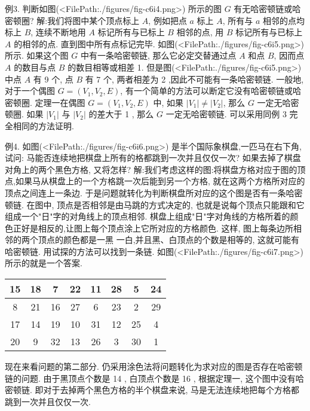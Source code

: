 例3. 判断如图(<FilePath:./figures/fig-c6i4.png>) 所示的图 $G$ 有无哈密顿链或哈密顿圈?
解:我们将图中某个顶点标上 $A$, 例如把点 $a$ 标上 $A$, 所有与 $a$ 相邻的点均标上 $B$, 连续不断地用 $A$ 标记所有与已标上 $B$ 相邻的点, 用 $B$ 标记所有与已标上 $A$ 的相邻的点.
直到图中所有点标记完毕.
如图(<FilePath:./figures/fig-c6i5.png>) 所示.
如果这个图 $G$ 中有一条哈密顿链, 那么它必定交替通过点 $A$ 和点 $B$, 因而点 $A$ 的数目与点 $B$ 的数目相等或相差 1. 但是图(<FilePath:./figures/fig-c6i5.png>) 中点 $A$ 有 9 个, 点 $B$ 有 7 个, 两者相差为 2 ,因此不可能有一条哈密顿链.
一般地, 对于一个偶图 $G=\left(V_1, V_2, E\right)$, 有一个简单的方法可以断定它没有哈密顿链或哈密顿圈.
定理一在偶图 $G=\left(V_1, V_2, E\right)$ 中, 如果 $\left|V_1\right| \neq\left|V_2\right|$, 那么 $G$ 一定无哈密顿圈.
如果 $\left|V_1\right|$ 与 $\left|V_2\right|$ 的差大于 1 , 那么 $G$ 一定无哈密顿链.
可以采用同例 3 完全相同的方法证明.



例4. 如图(<FilePath:./figures/fig-c6i6.png>) 是半个国际象棋盘,一匹马在右下角,试问: 马能否连续地把棋盘上所有的格都跳到一次并且仅仅一次? 如果去掉了棋盘对角上的两个黑色方格, 又将怎样?
解:我们考虑这样的图:将棋盘方格对应于图的顶点,如果马从棋盘上的一个方格跳一次后能到另一个方格, 就在这两个方格所对应的顶点之间连上一条边.
于是问题就转化为判断棋盘所对应的这个图是否有一条哈密顿链.
在图中, 顶点是否相邻是由马跳的方式决定的, 也就是说每个顶点只能跟和它组成一个"日"字的对角线上的顶点相邻.
棋盘上组成"日"字对角线的方格所着的颜色正好是相反的,让图上每个顶点涂上它所对应的方格颜色.
这样, 图上每条边所相邻的两个顶点的颜色都是一黑 一白,并且黑、白顶点的个数是相等的, 这就可能有哈密顿链.
用试探的方法可以找到一条链.
如图(<FilePath:./figures/fig-c6i7.png>) 所示的就是一个答案.
\begin{tabular}{|c|c|c|c|c|c|c|c|}
\hline 15 & 18 & 7 & 22 & 11 & 28 & 5 & 24 \\
\hline 8 & 21 & 16 & 27 & 6 & 23 & 2 & 29 \\
\hline 17 & 14 & 19 & 10 & 31 & 12 & 25 & 4 \\
\hline 20 & 9 & 32 & 13 & 26 & 3 & 30 & 1 \\
\hline
\end{tabular}
现在来看问题的第二部分.
仍采用涂色法将问题转化为求对应的图是否存在哈密顿链的问题.
由于黑顶点个数是 14 , 白顶点个数是 16 , 根据定理一, 这个图中没有哈密顿链.
即对于去掉两个黑色方格的半个棋盘来说, 马是无法连续地把每个方格都跳到一次并且仅仅一次.



